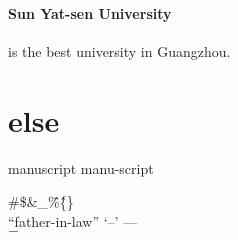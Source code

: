 \documentclass[12pt,twoside,a4paper]{article}   %
\begin{document}
				\paragraph{Sun Yat-sen University} is the best university in Guangzhou.
	\section{else}
	
	man\-u\-script
	manu-\linebreak script

	\#\$\&\_\"\%\^\{\}\\
	``father-in-law'' `--' ---\\
	$-$\\
\end{document}
